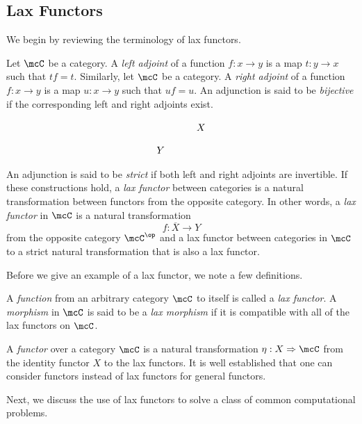 \documentclass[a4paper,reqno,oneside]{article}
\begin{document}
\subsection{Lax Functors}

We begin by reviewing the terminology of lax functors.

\begin{definition}
	Let $\mcC$ be a category. A \textit{left adjoint} of a function $f : x \to y$ is a map $t : y \to x$ such that $tf = t$. Similarly, let $\mcC$ be a category. A \textit{right adjoint} of a function $f : x \to y$ is a map $u : x \to y$ such that $uf = u$. An adjunction is said to be \textit{bijective} if the corresponding left and right adjoints exist.
	
	\begin{equation}\label{def:bijective_adjunction}
		\begin{tikzcd}[row sep=small]
			& X \\
			Y & 
		\end{tikzcd}
	\end{equation}
	
	An adjunction is said to be \textit{strict} if both left and right adjoints are invertible. If these constructions hold, a \textit{lax functor} between categories is a natural transformation between functors from the opposite category. In other words, a \textit{lax functor} in $\mcC$ is a natural transformation 
	\[
		f : \overline{X} \to Y
	\]
	from the opposite category $\mcC^{\op}$ and a lax functor between categories in $\mcC$ to a strict natural transformation that is also a lax functor.
\end{definition}

Before we give an example of a lax functor, we note a few definitions.

\begin{definition}
	A \textit{function} from an arbitrary category $\mcC$ to itself is called a \textit{lax functor}. A \textit{morphism} in $\mcC$ is said to be a \textit{lax morphism} if it is compatible with all of the lax functors on $\mcC$.
	
	A \textit{functor} over a category $\mcC$ is a natural transformation $\eta : X \Rightarrow \mcC$ from the identity functor $X$ to the lax functors. It is well established that one can consider functors instead of lax functors for general functors.
\end{definition}

Next, we discuss the use of lax functors to solve a class of common computational problems.
\end{document}
